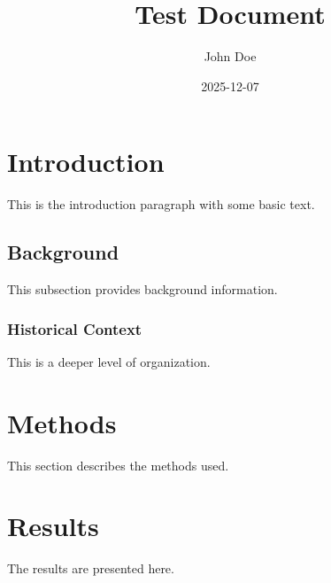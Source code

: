 \documentclass{article}
\title{Test Document}
\author{John Doe}
\date{2025-12-07}
\begin{document}
\maketitle

\section{Introduction}

This is the introduction paragraph with some basic text.

\subsection{Background}

This subsection provides background information.

\subsubsection{Historical Context}

This is a deeper level of organization.

\section{Methods}

This section describes the methods used.

\section{Results}

The results are presented here.
\end{document}
